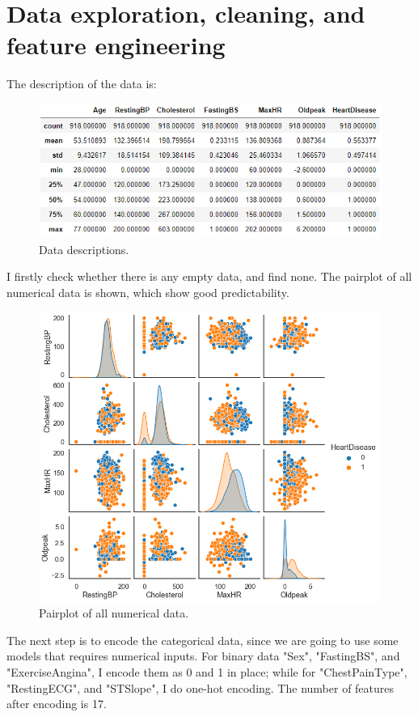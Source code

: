 \documentclass[11pt]{article}
\begin{document}
\section{Data exploration, cleaning, and feature engineering}\label{section-introduction-3}
The description of the data is:

\begin{figure}[h]
\centerline{\includegraphics[scale=0.6]{cls2.png}}
\caption{Data descriptions.}
\end{figure}

I firstly check whether there is any empty data, and find none.
The pairplot of all numerical data is shown, which show good predictability.

\begin{figure}[h!]
\centerline{\includegraphics[scale=0.5]{cls3.png}}
\caption{Pairplot of all numerical data.}
\end{figure}

The next step is to encode the categorical data, since we are going to use some models that requires numerical inputs.
For binary data "Sex", "FastingBS", and "ExerciseAngina", I encode them as 0 and 1 in place; while for "ChestPainType", "RestingECG", and "ST\textunderscore Slope", I do one-hot encoding. The number of features after encoding is 17.
\end{document}
